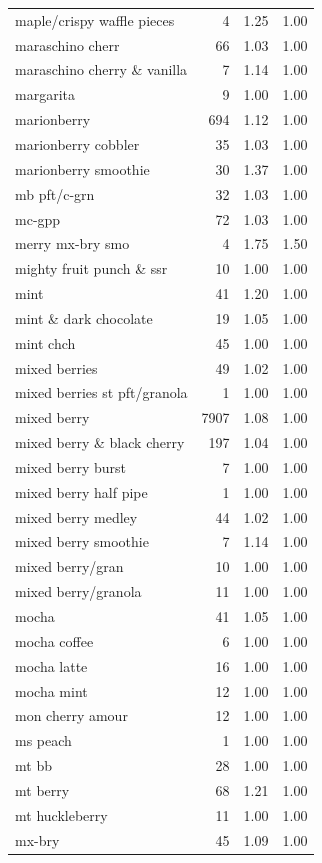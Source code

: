 \begin{table}
\begin{tabular}{lrrr}
maple/crispy waffle pieces & 4 & 1.25 & 1.00 \\
maraschino cherr & 66 & 1.03 & 1.00 \\
maraschino cherry \& vanilla & 7 & 1.14 & 1.00 \\
margarita & 9 & 1.00 & 1.00 \\
marionberry & 694 & 1.12 & 1.00 \\
marionberry cobbler & 35 & 1.03 & 1.00 \\
marionberry smoothie & 30 & 1.37 & 1.00 \\
mb pft/c-grn & 32 & 1.03 & 1.00 \\
mc-gpp & 72 & 1.03 & 1.00 \\
merry mx-bry smo & 4 & 1.75 & 1.50 \\
mighty fruit punch \& ssr & 10 & 1.00 & 1.00 \\
mint & 41 & 1.20 & 1.00 \\
mint \& dark chocolate & 19 & 1.05 & 1.00 \\
mint chch & 45 & 1.00 & 1.00 \\
mixed berries & 49 & 1.02 & 1.00 \\
mixed berries st pft/granola & 1 & 1.00 & 1.00 \\
mixed berry & 7907 & 1.08 & 1.00 \\
mixed berry \& black cherry & 197 & 1.04 & 1.00 \\
mixed berry burst & 7 & 1.00 & 1.00 \\
mixed berry half pipe & 1 & 1.00 & 1.00 \\
mixed berry medley & 44 & 1.02 & 1.00 \\
mixed berry smoothie & 7 & 1.14 & 1.00 \\
mixed berry/gran & 10 & 1.00 & 1.00 \\
mixed berry/granola & 11 & 1.00 & 1.00 \\
mocha & 41 & 1.05 & 1.00 \\
mocha coffee & 6 & 1.00 & 1.00 \\
mocha latte & 16 & 1.00 & 1.00 \\
mocha mint & 12 & 1.00 & 1.00 \\
mon cherry amour & 12 & 1.00 & 1.00 \\
ms peach & 1 & 1.00 & 1.00 \\
mt bb & 28 & 1.00 & 1.00 \\
mt berry & 68 & 1.21 & 1.00 \\
mt huckleberry & 11 & 1.00 & 1.00 \\
mx-bry & 45 & 1.09 & 1.00 \\

\end{tabular}
\end{table}

